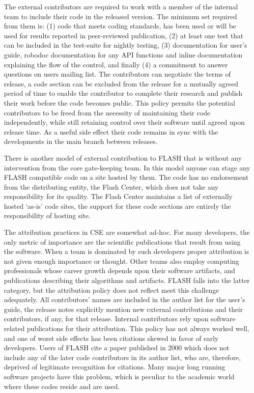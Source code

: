 The external contributors are required to work with a member of the
internal team to include their code in the released version. The
minimum set required from them is:  (1) code that meets coding standards,
has been used or will be used for results reported in peer-reviewed
publication, (2) at least one test that can be included in the
test-suite for nightly testing, (3) documentation for user's guide,
robodoc documentation for any API functions and inline documentation
explaining the flow of the control, and finally (4) a commitment to answer
questions on users mailing list. The contributors can negotiate the
terms of release, a code section can be excluded from the release for
a mutually agreed period of time to enable the contributor to complete
their research and publish their work before the code becomes
public. This policy permits the potential contributors to be freed
from the necessity of maintaining their code independently, while
still retaining control over their software until agreed upon
release time.  As a useful side effect their code remains in sync with
the developments in the main branch between releases.  

There is another model of external contribution to FLASH that is
without any intervention from the core gate-keeping team. In this
model anyone can stage any FLASH compatible code on a site hosted by
them. The code has no endorsement from the distributing entity, the
Flash Center, which does not take any responsibility for its
quality. The Flash Center maintains a list of externally hosted
`as-is' code sites, the support for these code sections are entirely
the responsibility of hosting site. 

The attribution practices in CSE are somewhat ad-hoc. For many
developers, the only metric of importance are the scientific
publications that result from using the software. When a team is
dominated by such developers proper attribution is not given enough
importance or thought. Other teams also employ computing professionals
whose career growth depends upon their software artifacts, and
publications describing their algorithms and artifacts. FLASH falls
into the latter category, but the attribution policy does not reflect
meet this challenge adequately. All
contributors' names are included in the author list for the user's
guide, the release notes explicitly mention new external
contributions and their contributors, if any, for that
release. Internal contributors rely upon software related publications
for their attribution. This policy has not always worked well, and one
of worst side effects has been citations skewed in favor of early
developers. Users of FLASH cite a paper published in 2000
\cite{Fryxell2000} which does not include any of the later code
contributors in its author list, who are, therefore, deprived of legitimate
recognition for citations.  Many major long running software projects
have this problem, which is peculiar to the academic world where these
codes reside and are used.  


